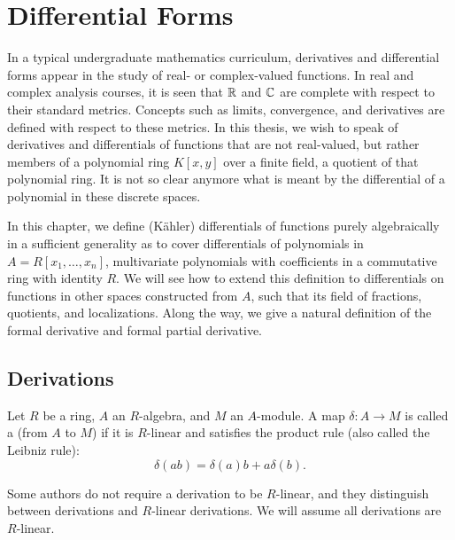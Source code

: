 
\section{Differential Forms}
\label{chap_differentials}

In a typical undergraduate mathematics curriculum,
derivatives and differential forms appear in the study of real- or complex-valued functions.
In real and complex analysis courses,
it is seen that $\mathbb{R}$ and $\mathbb{C}$ are complete with respect to their standard metrics.
Concepts such as limits, convergence, and derivatives are defined with respect to these metrics.
In this thesis, we wish to speak of derivatives and differentials of functions that are not real-valued,
but rather members of a polynomial ring $K[x,y]$ over a finite field, a quotient of that polynomial ring.
It is not so clear anymore what is meant by the differential of a polynomial in these discrete spaces.

In this chapter, we define (K\"ahler) differentials of functions purely algebraically
in a sufficient generality as to cover differentials of polynomials in $A = R[x_1, \ldots, x_n]$,
multivariate polynomials with coefficients in a commutative ring with identity $R$.
We will see how to extend this definition to differentials on functions in other spaces constructed from $A$,
such that its field of fractions, quotients, and localizations.
Along the way, we give a natural definition of the formal derivative and formal partial derivative.




\subsection{Derivations}
\begin{definition}
  Let $R$ be a ring, $A$ an $R$-algebra, and $M$ an $A$-module.
  A map $\delta : A \to M$ is called a  (from $A$ to $M$)
  if it is $R$-linear and satisfies the product rule
  (also called the Leibniz rule):
    \[ \delta(ab) = \delta(a)b + a\delta(b). \]
\end{definition}

Some authors do not require a derivation to be $R$-linear,
and they distinguish between derivations and $R$-linear derivations.
We will assume all derivations are $R$-linear.

